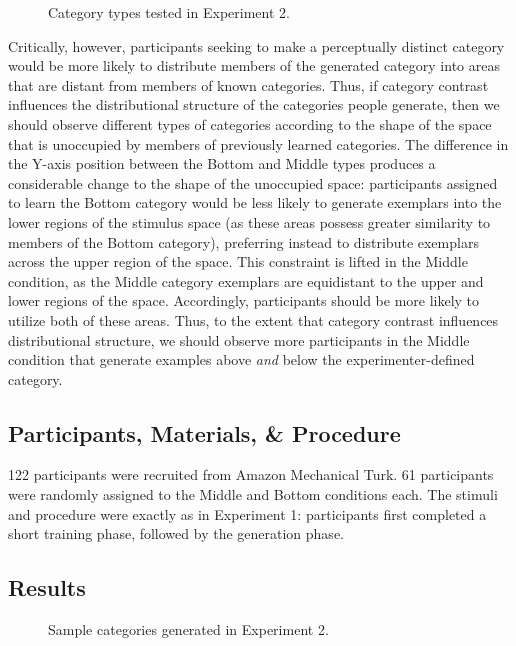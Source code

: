 \documentclass[12pt]{article}
\newcommand\inputpgf[2]{{
\let\pgfimageWithoutPath\pgfimage
\renewcommand{\pgfimage}[2][]{\pgfimageWithoutPath[##1]{#1/##2}}

}}
\begin{document}
\begin{flushleft}
\begin{figure}
    \begin{center}
    
    \caption{Category types tested in Experiment 2.}
    \label{fig:e2-conditions}
    \end{center}
\end{figure}

Critically, however, participants seeking to make a perceptually distinct category would be more likely to distribute members of the generated category into areas that are distant from members of known categories. Thus, if category contrast influences the distributional structure of the categories people generate, then we should observe different types of categories according to the shape of the space that is unoccupied by members of previously learned categories. The difference in the Y-axis position between the Bottom and Middle types produces a considerable change to the shape of the unoccupied space: participants assigned to learn the Bottom category would be less likely to generate exemplars into the lower regions of the stimulus space (as these areas possess greater similarity to members of the Bottom category), preferring instead to distribute exemplars across the upper region of the space. This constraint is lifted in the Middle condition, as the Middle category exemplars are equidistant to the upper and lower regions of the space. Accordingly, participants should be more likely to utilize both of these areas. Thus, to the extent that category contrast influences distributional structure, we should observe more participants in the Middle condition that generate examples above {\em and} below the experimenter-defined category.

\subsection{Participants, Materials, \& Procedure}

122 participants were recruited from Amazon Mechanical Turk. 61 participants were randomly assigned to the Middle and Bottom conditions each. The stimuli and procedure were exactly as in Experiment 1: participants first completed a short training phase, followed by the generation phase.


\subsection{Results}

\begin{figure}
    \begin{center}
    \inputpgf{figs/}{e2-samples.pgf}
    \caption{Sample categories generated in Experiment 2. }
    \label{fig:e2-samples}
    \end{center}
\end{figure}


\end{flushleft}
\end{document}
